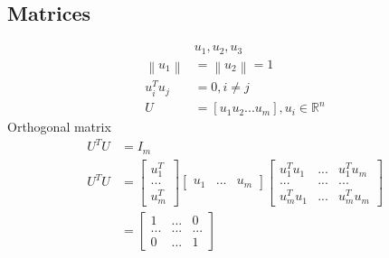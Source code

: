 \documentclass{article}
\begin{document}
\subsection{Matrices}
\begin{align*}
&u_{1}, u_{2}, u_{3}
\\ \left\|u_{1}\right\| &= \left\|u_{2}\right\| = 1
\\ u_{i}^{T} u_{j} &= 0, i \neq  j 
\\ U  &= \left[u_{1} u_{2} ... u_{m}\right], u_{i} \in \mathbb{R}^{n}
\end{align*}
Orthogonal matrix
\begin{align*}
U^{T} U &= I_{m}
\\ U^{T} U &= \begin{bmatrix} u_{1}^{T} \\ ... \\ u_{m}^{T} \end{bmatrix} \begin{bmatrix} u_{1} & ... & u_{m} \end{bmatrix} \begin{bmatrix} u_{1}^{T} u_{1} & ... & u_{1}^{T} u_{m} \\ ... & ... & ... \\ u_{m}^{T} u_{1} & ... & u_{m}^{T} u_{m} \end{bmatrix}
\\ &= \begin{bmatrix} 1 & ... & 0 \\ ... & ... & ... \\ 0 & ... & 1 \end{bmatrix}
\end{align*}
\end{document}
